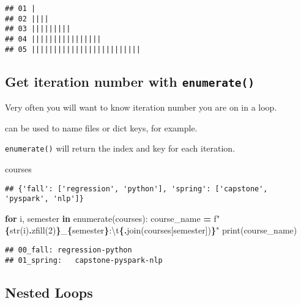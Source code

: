 \documentclass[
]{book}
\newenvironment{Shaded}{\begin{snugshade}}{\end{snugshade}}
\newcommand{\BuiltInTok}[1]{#1}
\newcommand{\CharTok}[1]{\textcolor[rgb]{0.31,0.60,0.02}{#1}}
\newcommand{\ControlFlowTok}[1]{\textcolor[rgb]{0.13,0.29,0.53}{\textbf{#1}}}
\newcommand{\DecValTok}[1]{\textcolor[rgb]{0.00,0.00,0.81}{#1}}
\newcommand{\KeywordTok}[1]{\textcolor[rgb]{0.13,0.29,0.53}{\textbf{#1}}}
\newcommand{\NormalTok}[1]{#1}
\newcommand{\OperatorTok}[1]{\textcolor[rgb]{0.81,0.36,0.00}{\textbf{#1}}}
\newcommand{\SpecialCharTok}[1]{\textcolor[rgb]{0.81,0.36,0.00}{\textbf{#1}}}
\newcommand{\SpecialStringTok}[1]{\textcolor[rgb]{0.31,0.60,0.02}{#1}}
\newcommand{\StringTok}[1]{\textcolor[rgb]{0.31,0.60,0.02}{#1}}
\begin{document}
\begin{verbatim}
## 01 |
## 02 ||||
## 03 |||||||||
## 04 ||||||||||||||||
## 05 |||||||||||||||||||||||||
\end{verbatim}

\subsection{\texorpdfstring{Get iteration number with \texttt{enumerate()}}{Get iteration number with enumerate()}}\label{get-iteration-number-with-enumerate}

Very often you will want to know iteration number you are on in a loop.

can be used to name files or dict keys, for example.

\texttt{enumerate()} will return the index and key for each iteration.

\begin{Shaded}
\begin{Highlighting}[]
\NormalTok{courses}
\end{Highlighting}
\end{Shaded}

\begin{verbatim}
## {'fall': ['regression', 'python'], 'spring': ['capstone', 'pyspark', 'nlp']}
\end{verbatim}

\begin{Shaded}
\begin{Highlighting}[]
\ControlFlowTok{for}\NormalTok{ i, semester }\KeywordTok{in} \BuiltInTok{enumerate}\NormalTok{(courses):}
\NormalTok{    course\_name }\OperatorTok{=} \SpecialStringTok{f"}\SpecialCharTok{\{}\BuiltInTok{str}\NormalTok{(i)}\SpecialCharTok{.}\NormalTok{zfill(}\DecValTok{2}\NormalTok{)}\SpecialCharTok{\}}\SpecialStringTok{\_}\SpecialCharTok{\{}\NormalTok{semester}\SpecialCharTok{\}}\SpecialStringTok{:}\CharTok{\textbackslash{}t}\SpecialCharTok{\{}\StringTok{\textquotesingle{}{-}\textquotesingle{}}\SpecialCharTok{.}\NormalTok{join(courses[semester])}\SpecialCharTok{\}}\SpecialStringTok{"}
    \BuiltInTok{print}\NormalTok{(course\_name)}
\end{Highlighting}
\end{Shaded}

\begin{verbatim}
## 00_fall: regression-python
## 01_spring:   capstone-pyspark-nlp
\end{verbatim}

\subsection{Nested Loops}\label{nested-loops}
\end{document}
